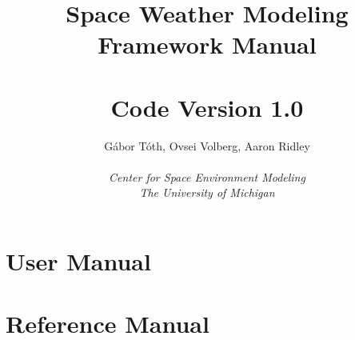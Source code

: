 \documentclass[twoside,10pt]{book}
\title{Space Weather Modeling Framework Manual \\ 
       \hfill \\
       \large Code Version 1.0}
\author{G\'abor T\'oth, Ovsei Volberg, Aaron Ridley\\
       \hfill \\
       {\it Center for Space Environment Modeling}\\
       {\it The University of Michigan}}
\begin{document}
\pagestyle{fancy}
\lhead[\fancyplain{}{\bfseries\thepage}]{\fancyplain{}{\bfseries\rightmark}}
\rhead[\fancyplain{}{\bfseries\leftmark}]{\fancyplain{}{\bfseries\thepage}}
\cfoot{}

\maketitle

\tableofcontents



\chapter{User Manual}








\chapter{Reference Manual}




\end{document}
